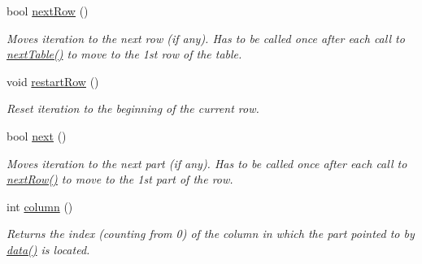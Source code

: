\begin{DoxyCompactItemize}
bool \hyperlink{classoption_1_1_print_usage_implementation_1_1_line_part_iterator_a55d5c3e50f9c1d8cd48f518899a5a48c}{next\+Row} ()
\begin{DoxyCompactList}\small\item\em Moves iteration to the next row (if any). Has to be called once after each call to \hyperlink{classoption_1_1_print_usage_implementation_1_1_line_part_iterator_afe43ca12d399ed3c871e4dc5bf63356e}{next\+Table()} to move to the 1st row of the table. \end{DoxyCompactList}\item 
\mbox{\label{classoption_1_1_print_usage_implementation_1_1_line_part_iterator_a96c448939f33a811174ea7b5addb312e}} 
void \hyperlink{classoption_1_1_print_usage_implementation_1_1_line_part_iterator_a96c448939f33a811174ea7b5addb312e}{restart\+Row} ()
\begin{DoxyCompactList}\small\item\em Reset iteration to the beginning of the current row. \end{DoxyCompactList}\item 
bool \hyperlink{classoption_1_1_print_usage_implementation_1_1_line_part_iterator_a58b8743da57de2d108472eee60324df6}{next} ()
\begin{DoxyCompactList}\small\item\em Moves iteration to the next part (if any). Has to be called once after each call to \hyperlink{classoption_1_1_print_usage_implementation_1_1_line_part_iterator_a55d5c3e50f9c1d8cd48f518899a5a48c}{next\+Row()} to move to the 1st part of the row. \end{DoxyCompactList}\item 
\mbox{\label{classoption_1_1_print_usage_implementation_1_1_line_part_iterator_afa41382acabcd37ca70f7e8b9994b8c0}} 
int \hyperlink{classoption_1_1_print_usage_implementation_1_1_line_part_iterator_afa41382acabcd37ca70f7e8b9994b8c0}{column} ()
\begin{DoxyCompactList}\small\item\em Returns the index (counting from 0) of the column in which the part pointed to by \hyperlink{classoption_1_1_print_usage_implementation_1_1_line_part_iterator_ada26229add63bd479c7877f2f8e32908}{data()} is located. \end{DoxyCompactList}\item 

\end{DoxyCompactItemize}
